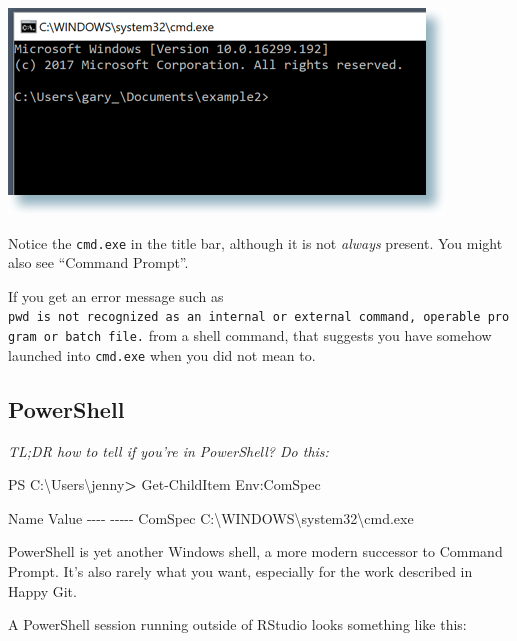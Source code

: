 \documentclass[
]{book}
\newenvironment{Shaded}{\begin{snugshade}}{\end{snugshade}}
\newcommand{\AttributeTok}[1]{\textcolor[rgb]{0.13,0.29,0.53}{#1}}
\newcommand{\DataTypeTok}[1]{\textcolor[rgb]{0.13,0.29,0.53}{#1}}
\newcommand{\ExtensionTok}[1]{#1}
\newcommand{\NormalTok}[1]{#1}
\newcommand{\OperatorTok}[1]{\textcolor[rgb]{0.81,0.36,0.00}{\textbf{#1}}}
\begin{document}
\includegraphics{img/2018-01-15_command-prompt.png}

Notice the \texttt{cmd.exe} in the title bar, although it is not \emph{always} present. You might also see ``Command Prompt''.

If you get an error message such as \texttt{\textquotesingle{}pwd\textquotesingle{}\ is\ not\ recognized\ as\ an\ internal\ or\ external\ command,\ operable\ program\ or\ batch\ file.} from a shell command, that suggests you have somehow launched into \texttt{cmd.exe} when you did not mean to.

\subsection{PowerShell}\label{powershell}

\emph{TL;DR how to tell if you're in PowerShell? Do this:}

\begin{Shaded}
\begin{Highlighting}[]
\ExtensionTok{PS}\NormalTok{ C:}\DataTypeTok{\textbackslash{}U}\NormalTok{sers}\DataTypeTok{\textbackslash{}j}\NormalTok{enny}\OperatorTok{\textgreater{}}\NormalTok{ Get{-}ChildItem Env:ComSpec}

\ExtensionTok{Name}\NormalTok{                           Value}
\ExtensionTok{{-}{-}{-}{-}}                           \AttributeTok{{-}{-}{-}{-}{-}}
\ExtensionTok{ComSpec}\NormalTok{                        C:}\DataTypeTok{\textbackslash{}W}\NormalTok{INDOWS}\DataTypeTok{\textbackslash{}s}\NormalTok{ystem32}\DataTypeTok{\textbackslash{}c}\NormalTok{md.exe}
\end{Highlighting}
\end{Shaded}

PowerShell is yet another Windows shell, a more modern successor to Command Prompt. It's also rarely what you want, especially for the work described in Happy Git.

A PowerShell session running outside of RStudio looks something like this:
\end{document}
